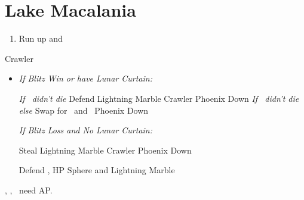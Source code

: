 \chapter{Lake Macalania}

\begin{enumerate}
  \item Run up and \sd
\end{enumerate}
\begin{battle}[1600]{Crawler}
  \begin{itemize}
    \switch{\tidus}{\rikku}
    \rikkuf Lightning Marble x1/2 Negator
    \rikkuf Lightning Marble Crawler
    \kimahrif Lightning Marble Crawler
    \luluf Phoenix Down \rikku
    \item \textit{If Blitz Win or have Lunar Curtain:}
    \begin{itemize}
    \switch{\kimahri}{\yuna} \textit{If \kimahri\ didn't die}
    \yunaf Defend
    \rikkuf Lightning Marble Crawler
    \luluf Phoenix Down \rikku \textit{If \kimahri\ didn't die else} Swap for \yuna\ and \yuna\ Phoenix Down \rikku
    \end{itemize}
    \textit{If Blitz Loss and No Lunar Curtain:}
    \begin{itemize}
    \kimahrif Steal
    \rikkuf Lightning Marble Crawler
    \switch{\lulu}{\yuna}
    \yunaf Phoenix Down \rikku
    \end{itemize}
    \switch{\yuna}{\tidus}
    \tidusf Defend
    \rikkuf \od, HP Sphere and Lightning Marble
  \end{itemize}
\tidus, \yuna, \lulu\ need AP.
\end{battle}
